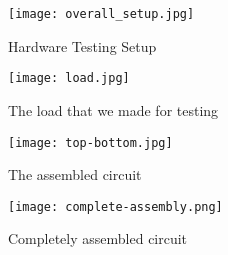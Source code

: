 \begin{figure}[H]
    \centering
    \texttt{[image: overall\_setup.jpg]}
    \caption{Hardware Testing Setup}
    \label{fig:overall_setup}
\end{figure}

\begin{figure}[H]
    \centering
    \texttt{[image: load.jpg]}
    \caption{The load that we made for testing}
    \label{fig:load}
\end{figure}

\begin{figure}[H]
    \centering
    \texttt{[image: top-bottom.jpg]}
    \caption{The assembled circuit}
    \label{fig:top-bottom}
\end{figure}

\begin{figure}[H]
    \centering
    \texttt{[image: complete-assembly.png]}
    \caption{Completely assembled circuit}
    \label{fig:complete-assembly}
\end{figure}


